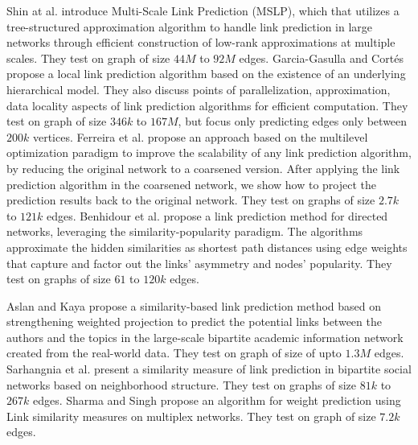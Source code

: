 Shin at al. \cite{shin2012multi} introduce Multi-Scale Link Prediction (MSLP), which that utilizes a tree-structured approximation algorithm to handle link prediction in large networks through efficient construction of low-rank approximations at multiple scales. They test on graph of size $44M$ to $92M$ edges.
Garcia-Gasulla and Cort{\'e}s \cite{garcia2014link} propose a local link prediction algorithm based on the existence of an underlying hierarchical model. They also discuss points of parallelization, approximation, data locality aspects of link prediction algorithms for efficient computation. They test on graph of size $346k$ to $167M$, but focus only predicting edges only between $200k$ vertices.
Ferreira et al. \cite{ferreira2019scalability} propose an approach based on the multilevel optimization paradigm to improve the scalability of any link prediction algorithm, by reducing the original network to a coarsened version. After applying the link prediction algorithm in the coarsened network, we show how to project the prediction results back to the original network. They test on graphs of size $2.7k$ to $121k$ edges.
Benhidour et al. \cite{benhidour2022approach} propose a link prediction method for directed networks, leveraging the similarity-popularity paradigm. The algorithms approximate the hidden similarities as shortest path distances using edge weights that capture and factor out the links' asymmetry and nodes' popularity. They test on graphs of size $61$ to $120k$ edges.

Aslan and Kaya \cite{aslan2018topic} propose a similarity-based link prediction method based on strengthening weighted projection to predict the potential links between the authors and the topics in the large-scale bipartite academic information network created from the real-world data. They test on graph of size of upto $1.3M$ edges.
Sarhangnia et al. \cite{sarhangnia2022novel} present a similarity measure of link prediction in bipartite social networks based on neighborhood structure. They test on graphs of size $81k$ to $267k$ edges.
Sharma and Singh \cite{sharma2016efficient} propose an algorithm for weight prediction using Link similarity measures on multiplex networks. They test on graph of size $7.2k$ edges.



